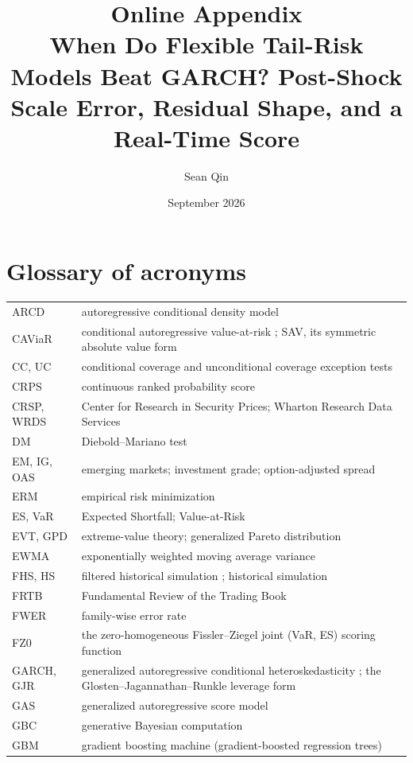 \documentclass[11pt]{article}
\title{Online Appendix\\ \large When Do Flexible Tail-Risk Models Beat GARCH? Post-Shock Scale Error, Residual Shape, and a Real-Time Score}
\author{Sean Qin}
\date{September 2026}
\begin{document}
\maketitle
\section{Glossary of acronyms}
\begin{tabular}{@{}lp{}@{}}
\toprule
ARCD & autoregressive conditional density model \citep{hansen1994ARCD} \\
CAViaR & conditional autoregressive value-at-risk \citep{engle2004caviar}; SAV, its symmetric absolute value form \\
CC, UC & conditional coverage \citep{christoffersen1998} and unconditional coverage \citep{kupiec1995} exception tests \\
CRPS & continuous ranked probability score \\
CRSP, WRDS & Center for Research in Security Prices; Wharton Research Data Services \\
DM & Diebold--Mariano test \citep{dieboldmariano1995} \\
EM, IG, OAS & emerging markets; investment grade; option-adjusted spread \\
ERM & empirical risk minimization \\
ES, VaR & Expected Shortfall; Value-at-Risk \\
EVT, GPD & extreme-value theory; generalized Pareto distribution \\
EWMA & exponentially weighted moving average variance \citep{riskmetrics1996} \\
FHS, HS & filtered historical simulation \citep{baroneadesi1999fhs}; historical simulation \\
FRTB & Fundamental Review of the Trading Book \citep{bcbs2019frtb} \\
FWER & family-wise error rate \\
FZ0 & the zero-homogeneous Fissler--Ziegel joint (VaR, ES) scoring function \citep{fissler2016, patton2019} \\
GARCH, GJR & generalized autoregressive conditional heteroskedasticity \citep{bollerslev1986}; the Glosten--Jagannathan--Runkle leverage form \citep{glosten1993} \\
GAS & generalized autoregressive score model \citep{patton2019} \\
GBC & generative Bayesian computation \citep{polson2023gbc} \\
GBM & gradient boosting machine (gradient-boosted regression trees) \\

\end{tabular}
\end{document}

